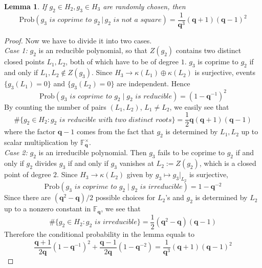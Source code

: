 \documentclass[12pt]{article}
\theoremstyle{plain}
\newtheorem{lemma}[equation]{Lemma}
\theoremstyle{definition}
\newcommand{\IF}{\mathbb{F}}
\newcommand{\<}{\langle}
\renewcommand{\>}{\rangle}
\newcommand{\Prob}{\mathrm{Prob}}
\begin{document}
\begin{lemma}
\label{nonsquare} 
If $g_2 \in H_2, g_3 \in H_3$ are randomly chosen, then 
$$ \Prob(g_3 \textit{ is coprime to } g_2 \, | \, g_2 \textit{ is not a square}) = \frac{1}{\pmb{q}^3}(\pmb{q} + 1)(\pmb{q} - 1)^2 $$ 
\end{lemma}
\begin{proof}
Now we have to divide it into two cases. \\
\textit{Case 1:} $g_2$ is an reducible polynomial, so that $Z(g_2)$ contains two distinct closed points $L_1, L_2$, both of which have to be of degree $1$. $g_3$ is coprime to $g_2$ if and only if $L_1, L_2 \not\in Z(g_3)$. Since $H_3 \to \kappa(L_1) \oplus \kappa(L_2)$ is surjective, events $\{ g_3(L_1) = 0\} $ and $\{ g_3(L_2) = 0 \}$ are independent. Hence
$$\Prob(g_3 \textit{ is coprime to }g_2 \mid g_2 \textit{ is reducible}) = (1 - \pmb{q}^{-1})^2 $$ By counting the number of pairs $(L_1, L_2)$, $L_1 \neq L_2$, we easily see that 
$$ \# \{ g_2 \in H_2 : g_2 \textit{ is reducible with two distinct roots} \} = \frac{1}{2}\pmb{q}(\pmb{q} + 1)(\pmb{q} - 1)$$
where the factor $\pmb{q} - 1$ comes from the fact that $g_2$ is determined by $L_1, L_2$ up to scalar multiplication by $\IF_{\pmb{q}}^\times$. \\
\textit{Case 2:} $g_2$ is an irreducible polynomial. Then $g_3$ fails to be coprime to $g_2$ if and only if $g_2$ divides $g_3$ if and only if $g_3$ vanishes at $L_2:= Z(g_2)$, which is a closed point of degree $2$. Since $H_3 \to \kappa(L_2)$ given by $g_3 \mapsto g_3|_{L_2}$ is surjective, 
$$\Prob(g_3 \textit{ is coprime to }g_2 \mid g_2 \textit{ is irreducible}) = 1 - \pmb{q}^{-2} $$
Since there are $(\pmb{q}^2 - \pmb{q})/2$ possible choices for $L_2$'s and $g_2$ is determined by $L_2$ up to a nonzero constant in $\IF_{\pmb{q}}$, we see that 
$$ \# \{ g_2 \in H_2 : g_2 \textit{ is irreducible} \} = \frac{1}{2}(\pmb{q}^2 - \pmb{q})(\pmb{q} - 1)$$ 
Therefore the conditional probability in the lemma equals to 
$$ \frac{\pmb{q} + 1}{2\pmb{q}} (1 - \pmb{q}^{-1})^2 +  \frac{\pmb{q} - 1}{2\pmb{q}} (1 - \pmb{q}^{-2}) =  \frac{1}{\pmb{q}^3}(\pmb{q} + 1)(\pmb{q} - 1)^2 $$
\end{proof}
\end{document}
